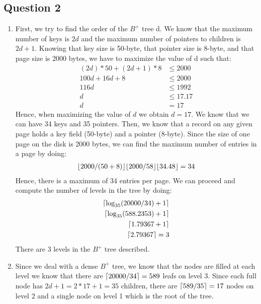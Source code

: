 \newpage
\subsection*{Question 2}

\begin{enumerate}[label={(\alph*)}]
    \item First, we try to find the order of the $B^+$ tree d. We know that the maximum number of keys is $2d$ and the maximum number of pointers to children is $2d + 1$. Knowing that key size is 50-byte, that pointer size is 8-byte, and that page size is 2000 bytes, we have to maximize the value of d such that:
    \begin{align*}
        (2d)*50 + (2d + 1)*8 &\leq 2000\\
        100d + 16d + 8 &\leq 2000\\
        116d &\leq 1992 \\
        d &\leq 17.17 \\
        d &= 17
    \end{align*}
    \noindent Hence, when maximizing the value of $d$ we obtain $d=17$. We know that we can have 34 keys and 35 pointers. Then, we know that a record on any given page holds a key field (50-byte) and a pointer (8-byte). Since the size of one page on the disk is 2000 bytes, we can find the maximum number of entries in a page by doing:
    \begin{align*}
        \lfloor2000 / (50 + 8)\rfloor
        \lfloor2000 / 58\rfloor
        \lfloor34.48\rfloor = 34
    \end{align*}
    \noindent Hence, there is a maximum of 34 entries per page. We can proceed and compute the number of levels in the tree by doing:
    \begin{align*}
        \lceil\log_{35}(20000/34) + 1\rceil\\
        \lceil\log_{35}(588.2353) + 1\rceil\\
        \lceil1.79367 + 1\rceil\\
        \lceil2.79367\rceil = 3
    \end{align*}
    \noindent There are 3 levels in the $B^+$ tree described.
    
    \item Since we deal with a dense $B^+$ tree, we know that the nodes are filled at each level we know that there are $\lceil20000/34\rceil = 589$ leafs on level 3. Since each full node has $2d+1 = 2*17 + 1 = 35$ children, there are $\lceil589/35\rceil = 17$ nodes on level 2 and a single node on level 1 which is the root of the tree. 
    

\end{enumerate}
